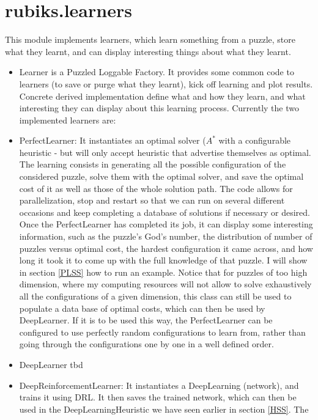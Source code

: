 \section{rubiks.learners}
\label{PLcode}
\label{DRLcode}
This module implements learners, which learn something from a puzzle, store what they learnt, and can display interesting things about what they learnt.

\begin{itemize}
\item Learner is a Puzzled Loggable Factory. It provides some common code to learners (to save or purge what they learnt), kick off learning and plot results. Concrete derived implementation define what and how they learn, and what interesting they can display about this learning process. Currently the two implemented learners are:
\item PerfectLearner: It instantiates an optimal solver ($A^{*}$ with a configurable heuristic - but will only accept heuristic that advertise themselves as optimal. The learning consists in generating all the possible configuration of the considered puzzle, solve them with the optimal solver, and save the optimal cost of it as well as those of the whole solution path. The code allows for parallelization, stop and restart so that we can run on several different occasions and keep completing a database of solutions if necessary or desired. Once the PerfectLearner has completed its job, it can display some interesting information, such as the puzzle's God's number, the distribution of number of puzzles versus optimal cost, the hardest configuration it came across, and how long it took it to come up with the full knowledge of that puzzle. I will show in section \ref{PLSS} how to run an example. Notice that for puzzles of too high dimension, where my computing resources will not allow to solve exhaustively all the configurations of a given dimension, this class can still be used to populate a data base of optimal costs, which can then be used by DeepLearner. If it is to be used this way, the PerfectLearner can be configured to use perfectly random configurations to learn from, rather than going through the configurations one by one in a well defined order.

\item DeepLearner tbd
\item DeepReinforcementLearner: It instantiates a DeepLearning (network), and trains it using DRL. It then saves the trained network, which can then be used in the DeepLearningHeuristic we have seen earlier in section \ref{HSS}. The


\end{itemize}



